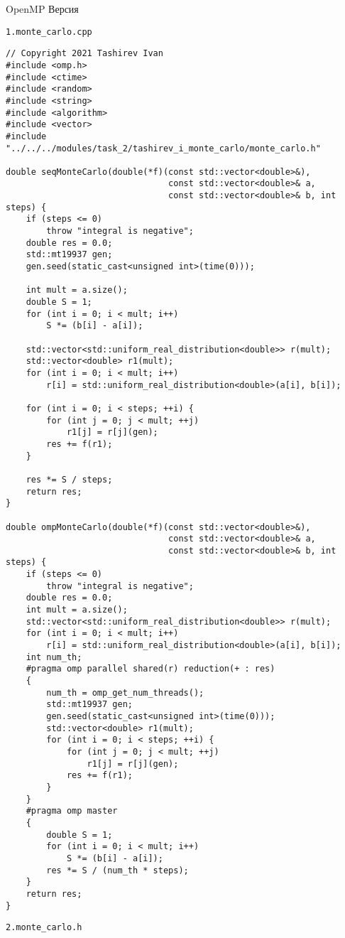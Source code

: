 \documentclass{report}
\begin{document}
\par OpenMP Версия
\par \verb|1.monte_carlo.cpp|
\begin{lstlisting}
// Copyright 2021 Tashirev Ivan
#include <omp.h>
#include <ctime>
#include <random>
#include <string>
#include <algorithm>
#include <vector>
#include "../../../modules/task_2/tashirev_i_monte_carlo/monte_carlo.h"

double seqMonteCarlo(double(*f)(const std::vector<double>&),
                                const std::vector<double>& a,
                                const std::vector<double>& b, int steps) {
    if (steps <= 0)
        throw "integral is negative";
    double res = 0.0;
    std::mt19937 gen;
    gen.seed(static_cast<unsigned int>(time(0)));

    int mult = a.size();
    double S = 1;
    for (int i = 0; i < mult; i++)
        S *= (b[i] - a[i]);

    std::vector<std::uniform_real_distribution<double>> r(mult);
    std::vector<double> r1(mult);
    for (int i = 0; i < mult; i++)
        r[i] = std::uniform_real_distribution<double>(a[i], b[i]);

    for (int i = 0; i < steps; ++i) {
        for (int j = 0; j < mult; ++j)
            r1[j] = r[j](gen);
        res += f(r1);
    }

    res *= S / steps;
    return res;
}

double ompMonteCarlo(double(*f)(const std::vector<double>&),
                                const std::vector<double>& a,
                                const std::vector<double>& b, int steps) {
    if (steps <= 0)
        throw "integral is negative";
    double res = 0.0;
    int mult = a.size();
    std::vector<std::uniform_real_distribution<double>> r(mult);
    for (int i = 0; i < mult; i++)
        r[i] = std::uniform_real_distribution<double>(a[i], b[i]);
    int num_th;
    #pragma omp parallel shared(r) reduction(+ : res)
    {
        num_th = omp_get_num_threads();
        std::mt19937 gen;
        gen.seed(static_cast<unsigned int>(time(0)));
        std::vector<double> r1(mult);
        for (int i = 0; i < steps; ++i) {
            for (int j = 0; j < mult; ++j)
                r1[j] = r[j](gen);
            res += f(r1);
        }
    }
    #pragma omp master
    {
        double S = 1;
        for (int i = 0; i < mult; i++)
            S *= (b[i] - a[i]);
        res *= S / (num_th * steps);
    }
    return res;
}
\end{lstlisting}
\par \verb|2.monte_carlo.h|
\end{document}
